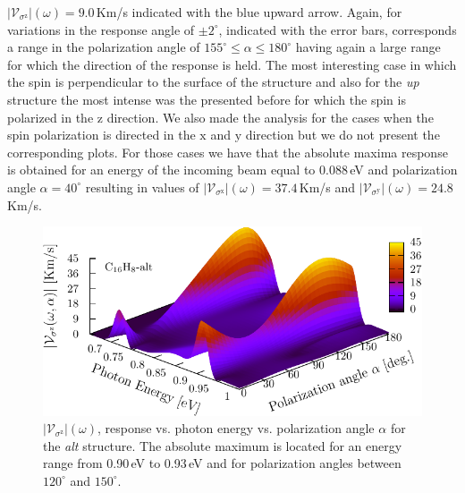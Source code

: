 \documentclass[prb,11pt,tightenlines,twocolumn,aps]{revtex4-1}
\begin{document}
$|\mathcal{V}_{\sigma^{\mathrm{z}}}|(\omega)=9.0$\,Km/s indicated with the blue
upward arrow. Again, for variations in the response angle of $\pm2^{\circ}$,
indicated with the error bars, corresponds a range in the polarization angle of
$155^{\circ} \leq \alpha \leq 180^{\circ}$ having again a large range for which
the direction of the response is held.
% 
% 
The most interesting case in which the spin is perpendicular to the surface of
the structure and also for the \emph{up} structure the most intense was the
presented before for which the spin is polarized in the $\mathrm{z}$ direction.
We also made the analysis for the cases when the spin polarization is directed
in the $\mathrm{x}$ and $\mathrm{y}$ direction but we do not present the
corresponding plots. For those cases we have that the absolute maxima response
is obtained for an energy of the incoming beam equal to 0.088\,eV and
polarization angle $\alpha=40^{\circ}$ resulting in values of
$|\mathcal{V}_{\sigma^{\mathrm{x}}}|(\omega)=37.4$\,Km/s and
$|\mathcal{V}_{\sigma^{\mathrm{y}}}|(\omega)=24.8$\,Km/s.



\begin{figure}[tb]
    \centering
    \includegraphics[width=\linewidth]{altplots/alt-3d-svaz}
    \caption{$|\mathcal{V}_{\sigma^{\mathrm{z}}}|(\omega)$, response
    vs. photon energy vs. polarization angle $\alpha$ for the \emph{alt}
    structure. The absolute maximum is located for an energy range from 0.90\,eV
    to 0.93\,eV and for polarization angles between $120^{\circ}$ and
    $150^{\circ}$.}
    \label{fig:alt-3d-vsb}
\end{figure}
\end{document}
